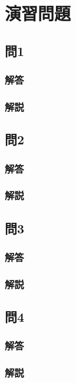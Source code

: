 \section{演習問題}
\subsection{問1}
\subsubsection{解答}

\subsubsection{解説}

\subsection{問2}
\subsubsection{解答}

\subsubsection{解説}

\subsection{問3}
\subsubsection{解答}

\subsubsection{解説}

\subsection{問4}
\subsubsection{解答}

\subsubsection{解説}

